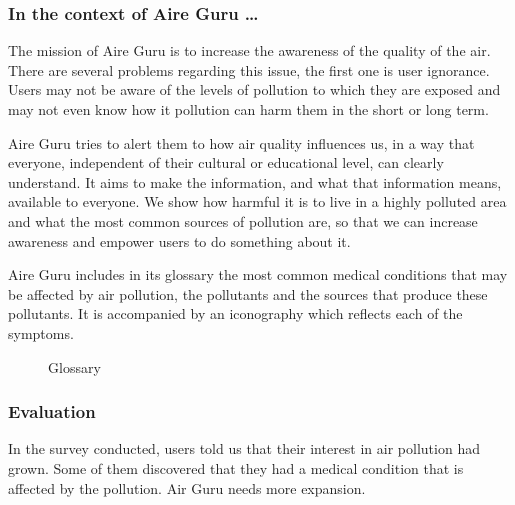 \subsubsection*{In the context of Aire Guru \ldots}

The mission of Aire Guru is to increase the awareness of the quality of the air.
There are several problems regarding this issue, the first one is user ignorance. Users may not be
aware of the levels of pollution to which they are exposed and may not even know how it pollution can harm them
in the short or long term.

Aire Guru tries to alert them to how air quality influences us, in a way that everyone, independent of their cultural or educational level,
can clearly understand. It aims to make the information, and what that information means, available to everyone. We show how harmful it is to live in a highly polluted area and what the most common sources of pollution
are, so that we can increase awareness and empower users to do something about it.


Aire Guru includes in its glossary the most common medical conditions that may be affected by air pollution, the pollutants and the sources that produce these pollutants. It is accompanied by an iconography
which reflects each of the symptoms. \\

\begin{figure}[ht]
    \centering
    \hfill
  
  \caption{Glossary}
    \end{figure}

\subsubsection*{Evaluation}  

\begin{itemize}
    \done In the survey conducted, users told us that their interest in air pollution had grown. Some of them discovered that they had a medical condition that is affected by the pollution.
    \crossed Air Guru needs more expansion.
\end{itemize}